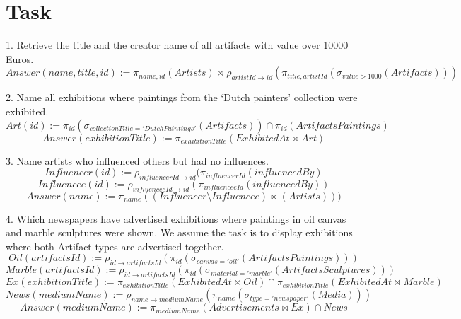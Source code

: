 \documentclass{article}
\begin{document}
\section{Task}
\par 1. Retrieve the title and the creator name of all artifacts with value over 10000 Euros.
$$Answer(name, title, id) := \pi_{name, id}(Artists) \bowtie \rho_{artistId \rightarrow id}(\pi_{title, artistId}(\sigma_{value>1000}(Artifacts)))$$
\par 2. Name all exhibitions where paintings from the ‘Dutch painters’ collection were exhibited.
$$Art(id) := \pi_{id}(\sigma_{collectionTitle = 'Dutch Paintings'}(Artifacts)) \cap \pi_{id}(ArtifactsPaintings)$$
$$Answer(exhibitionTitle) := \pi_{exhibitionTitle}(ExhibitedAt\bowtie Art)$$
\par 3. Name artists who influenced others but had no influences.
$$Influencer(id) := \rho_{influencerId \rightarrow id}(\pi_{influencerId}(influencedBy)$$
$$Influencee(id) := \rho_{influenceeId \rightarrow id}(\pi_{influenceeId}(influencedBy))$$
$$Answer(name) := \pi_{name}((Influencer \setminus Influencee)\bowtie (Artists)))$$
\par 4. Which newspapers have advertised exhibitions where paintings in oil canvas and marble sculptures were shown. \newline 
We assume the task is to display exhibitions where both Artifact types are advertised together.
$$Oil(artifactsId) := \rho_{id \rightarrow artifactsId}(\pi_{id}(\sigma_{canvas = 'oil'}(ArtifactsPaintings)))$$
$$Marble(artifactsId) := \rho_{id \rightarrow artifactsId}(\pi_{id}(\sigma_{material = 'marble'}(ArtifactsSculptures)))$$
$$Ex(exhibitionTitle) := \pi_{exhibitionTitle}(ExhibitedAt \bowtie Oil) \cap \pi_{exhibitionTitle}(ExhibitedAt \bowtie Marble)$$
$$News(mediumName) := \rho_{name \rightarrow mediumName}(\pi_{name}(\sigma_{type = 'newspaper'}(Media)))$$
$$Answer(mediumName) := \pi_{mediumName}(Advertisements \bowtie Ex) \cap News$$

\newpage
\end{document}
